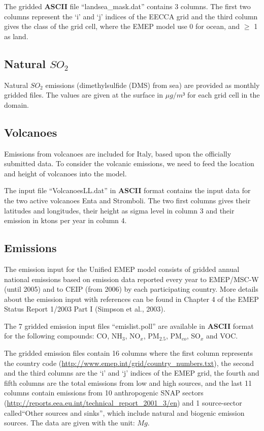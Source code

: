 The gridded {\bf ASCII} file ``landsea\_mask.dat'' contains 3 columns. 
The first two columns represent the `i' and `j' indices of the EECCA
grid and the third column gives the class of the grid cell, where the 
EMEP model use 0 for ocean, and $\geq$ 1 as land.



\subsection{Natural $SO_2$}
Natural $SO_2$ emissions (dimethylsulfide (DMS) from sea) are provided 
as monthly gridded files.  
The values are given at the surface in $\mu g /m³ $ for each grid cell in the domain. 

\subsection{Volcanoes}

Emissions from volcanoes are included for Italy, based upon the
officially submitted data.
To consider the volcanic emissions, we need to feed the location
and height of volcanoes into the model. 

The input file ``VolcanoesLL.dat'' in {\bf ASCII} format contains the input data for the two active volcanoes
 Enta and Stromboli. The two first columns gives their latitudes and longitudes, their height as sigma level
 in column 3 and their emission in ktons per year in column 4. 

\subsection{Emissions}
The emission input for the Unified EMEP model consists of gridded
annual national emissions based on emission data reported every year
to EMEP/MSC-W (until 2005) 
and to CEIP (from 2006) by each
participating country. 
More details about the emission input with references can be
found in Chapter 4 of the EMEP Status Report 1/2003 Part I 
(Simpson et al., 2003).

The 7 gridded emission input files ``emislist.poll'' are available in 
{\bf ASCII} format for the following compounds: CO, NH$_{3}$,
NO$_{x}$, PM$_{2.5}$, PM$_{co}$, SO$_{x}$ and VOC.

The gridded emission files contain 16 columns where the first column 
represents the country code
(\url{http://www.emep.int/grid/country_numbers.txt}), 
the second and the third columns are the `i' and `j' indices of the
EMEP grid, the fourth and fifth columns are the total emissions from
low and high sources, and the last 11 columns contain emissions from 
10 anthropogenic SNAP sectors 
(\url{http://reports.eea.eu.int/technical_report_2001_3/en}) and 1 
source-sector called``Other sources and sinks'', which include natural and
biogenic emission sources. The data are given with the unit: $Mg$.

